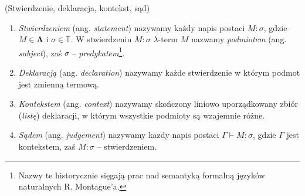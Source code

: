 
\begin{definicja}(Stwierdzenie, deklaracja, kontekst, sąd)\label{def:statement_simple}
  \begin{enumerate}[label=(\arabic*)]
  \setlength\itemsep{0em}
  \item \emph{Stwierdzeniem} (ang. \emph{statement}) nazywamy każdy napis postaci \(M:\sigma\), gdzie \(M\in\mathbf{\Lambda}\) i \(\sigma\in\mathbb{T}\). W stwierdzeniu \(M:\sigma\) \(\lambda\)-term \(M\) nazwamy \emph{podmiotem}  (ang. \emph{subject}), zaś \(\sigma\) -- \emph{predykatem}\footnote{Nazwy te historycznie sięgają prac nad semantyką formalną języków naturalnych R. Montague'a.}.
  \item \emph{Deklaracją} (ang. \emph{declaration}) nazywamy każde stwierdzenie w którym podmot jest zmienną termową.
  \item \emph{Kontekstem} (ang. \emph{context}) nazywamy skończony liniowo uporządkowany zbiór (\emph{listę}) deklaracji, w którym wszystkie podmioty są wzajemnie różne.
  \item \emph{Sądem} (ang. \emph{judgement}) nazywamy kazdy napis postaci \(\Gamma\vdash M:\sigma\), gdzie \(\Gamma\) jest kontekstem, zaś \(M:\sigma\) -- stwierdzeniem.  
  \end{enumerate}
\end{definicja}


